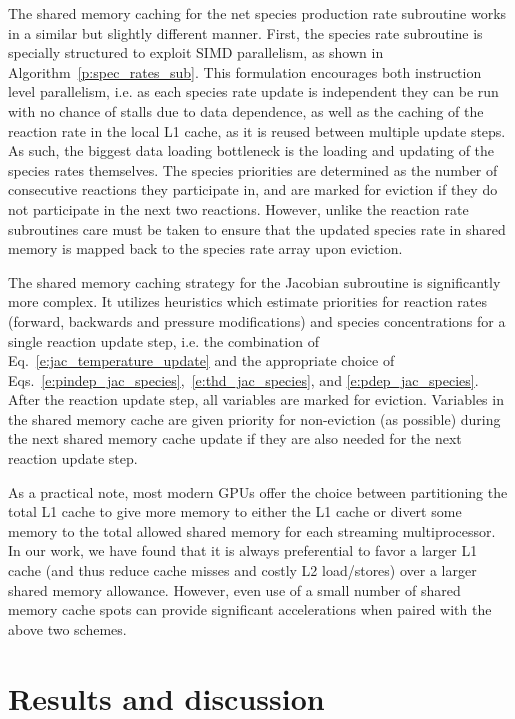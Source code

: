 \documentclass[preprint,12pt]{elsarticle}
\begin{document}
{The shared memory caching for the net species production rate subroutine works in a similar but slightly different manner.
First, the species rate subroutine is specially structured to exploit SIMD parallelism, as shown in Algorithm~\eqref{p:spec_rates_sub}.
This formulation encourages both instruction level parallelism, i.e. as each species rate update is independent they can be run with no chance of stalls due to data dependence, as well as the caching of the reaction rate in the local L1 cache, as it is reused between multiple update steps.
As such, the biggest data loading bottleneck is the loading and updating of the species rates themselves.
The species priorities are determined as the number of consecutive reactions they participate in, and are marked for eviction if they do not participate in the next two reactions.
However, unlike the reaction rate subroutines care must be taken to ensure that the updated species rate in shared memory is mapped back to the species rate array upon eviction.

The shared memory caching strategy for the Jacobian subroutine is significantly more complex.
It utilizes heuristics which estimate priorities for reaction rates (forward, backwards and pressure modifications) and species concentrations for a single reaction update step, i.e. the combination of Eq.~\eqref{e:jac_temperature_update} and the appropriate choice of Eqs.~\eqref{e:pindep_jac_species},~\eqref{e:thd_jac_species}, and \eqref{e:pdep_jac_species}.
After the reaction update step, all variables are marked for eviction.
Variables in the shared memory cache are given priority for non-eviction (as possible) during the next shared memory cache update if they are also needed for the next reaction update step.

As a practical note, most modern GPUs offer the choice between partitioning the total L1 cache to give more memory to either the L1 cache or divert some memory to the total allowed shared memory for each streaming multiprocessor.
In our work, we have found that it is always preferential to favor a larger L1 cache (and thus reduce cache misses and costly L2 load/stores) over a larger shared memory allowance.
However, even use of a small number of shared memory cache spots can provide significant accelerations when paired with the above two schemes.

\section{Results and discussion}
\label{s:results}

}
\end{document}
